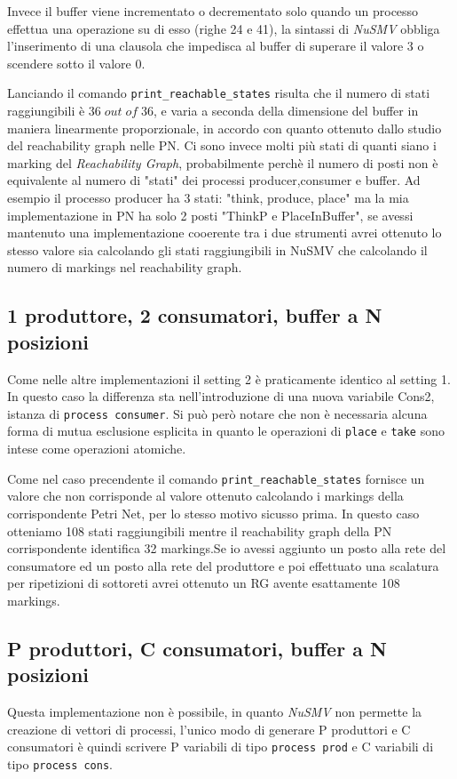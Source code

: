 \documentclass[a4paper]{article}
\begin{document}
Invece il buffer viene incrementato o decrementato solo quando un processo effettua una operazione su di esso (righe 24 e 41), la sintassi di \textit{NuSMV} obbliga l'inserimento di una clausola che impedisca al buffer di superare il valore 3 o scendere sotto il valore 0.

Lanciando il comando \texttt{print\_reachable\_states} risulta che il numero di stati raggiungibili è $36 \; out \; of \; 36$, e varia a seconda della dimensione del buffer in maniera linearmente proporzionale, in accordo con quanto ottenuto dallo studio del reachability graph nelle PN.
Ci sono invece molti più stati di quanti siano i marking del \textit{Reachability Graph}, probabilmente perchè il numero di posti non è equivalente al numero di "stati" dei processi producer,consumer e buffer.
Ad esempio il processo producer ha 3 stati: "think, produce, place" ma la mia implementazione in PN ha solo 2 posti "ThinkP e PlaceInBuffer", se avessi mantenuto una implementazione cooerente tra i due strumenti avrei ottenuto lo stesso valore sia calcolando gli stati raggiungibili in NuSMV che calcolando il numero di markings nel reachability graph.
\newpage
\subsection{1 produttore, 2 consumatori, buffer a N posizioni}

Come nelle altre implementazioni il setting 2 è praticamente identico al setting 1. In questo caso la differenza sta nell'introduzione di una nuova variabile Cons2, istanza di \texttt{process consumer}.
Si può però notare che non è necessaria alcuna forma di mutua esclusione esplicita in quanto le operazioni di \texttt{place} e \texttt{take} sono intese come operazioni atomiche.

Come nel caso precendente il comando \texttt{print\_reachable\_states} fornisce un valore che non corrisponde al valore ottenuto calcolando i markings della corrispondente Petri Net, per lo stesso motivo sicusso prima.
In questo caso otteniamo 108 stati raggiungibili mentre il reachability graph della PN corrispondente identifica 32 markings.Se io avessi aggiunto un posto alla rete del consumatore ed un posto alla rete del produttore e poi effettuato una scalatura per ripetizioni di sottoreti avrei ottenuto un RG avente esattamente 108 markings.
\newpage
\subsection{P produttori, C consumatori, buffer a N posizioni}
Questa implementazione non è possibile, in quanto \emph{NuSMV} non permette la creazione di vettori di processi, l'unico modo di generare P produttori e C consumatori è quindi scrivere P variabili di tipo \texttt{process prod} e C variabili di tipo \texttt{process cons}.
\end{document}
